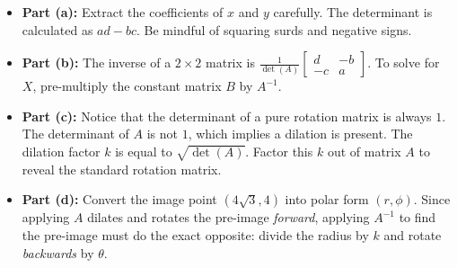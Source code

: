 \begin{hint}
\begin{itemize}
    \item \textbf{Part (a):} Extract the coefficients of $x$ and $y$ carefully. The determinant is calculated as $ad - bc$. Be mindful of squaring surds and negative signs.
    \item \textbf{Part (b):} The inverse of a $2 \times 2$ matrix is $\frac{1}{\det(A)} \begin{bmatrix} d & -b \\ -c & a \end{bmatrix}$. To solve for $X$, pre-multiply the constant matrix $B$ by $A^{-1}$.
    \item \textbf{Part (c):} Notice that the determinant of a pure rotation matrix is always $1$. The determinant of $A$ is not $1$, which implies a dilation is present. The dilation factor $k$ is equal to $\sqrt{\det(A)}$. Factor this $k$ out of matrix $A$ to reveal the standard rotation matrix.
    \item \textbf{Part (d):} Convert the image point $(4\sqrt{3}, 4)$ into polar form $(r, \phi)$. Since applying $A$ dilates and rotates the pre-image \textit{forward}, applying $A^{-1}$ to find the pre-image must do the exact opposite: divide the radius by $k$ and rotate \textit{backwards} by $\theta$.
\end{itemize}
\end{hint}

